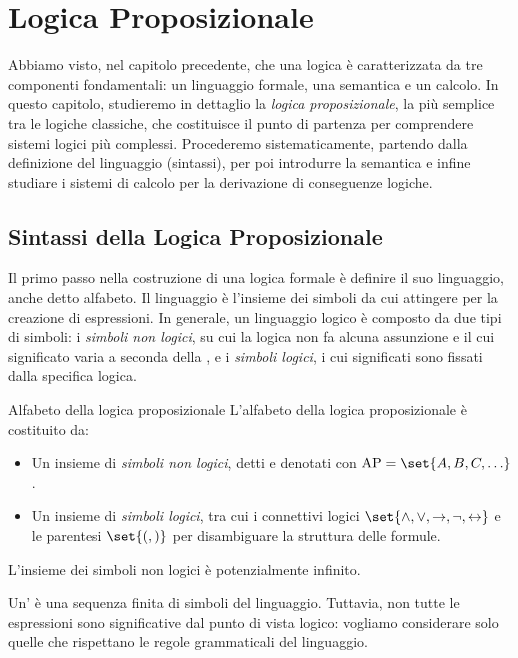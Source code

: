 \chapter{Logica Proposizionale}

Abbiamo visto, nel capitolo precedente, che una logica è caratterizzata da tre componenti fondamentali: un linguaggio formale, una semantica e un calcolo.
In questo capitolo, studieremo in dettaglio la \textit{logica proposizionale}, la più semplice tra le logiche classiche, che costituisce il punto di partenza per comprendere sistemi logici più complessi.
Procederemo sistematicamente, partendo dalla definizione del linguaggio (sintassi), per poi introdurre la semantica e infine studiare i sistemi di calcolo per la derivazione di conseguenze logiche.

\section{Sintassi della Logica Proposizionale}

Il primo passo nella costruzione di una logica formale è definire il suo linguaggio, anche detto alfabeto. Il linguaggio è l'insieme dei simboli da cui attingere per la creazione di espressioni.
In generale, un linguaggio logico è composto da due tipi di simboli: i \textit{simboli non logici}, su cui la logica non fa alcuna assunzione e il cui significato varia a seconda della , e i \textit{simboli logici}, i cui significati sono fissati dalla specifica logica.

\begin{definition}{Alfabeto della logica proposizionale}
  L'alfabeto della logica proposizionale è costituito da:
  \begin{itemize}
    \item Un insieme di \textit{simboli non logici}, detti  e denotati con \(\AP = \set{A,B,C,\ldots}\).
    \item Un insieme di \textit{simboli logici}, tra cui i connettivi logici \(\set{\land, \lor, \rightarrow, \neg,\leftrightarrow}\) e le parentesi \(\set{(,)}\) per disambiguare la struttura delle formule.
  \end{itemize}
\end{definition}

\begin{note}{}
L'insieme dei simboli non logici è potenzialmente infinito.
\end{note}

Un' è una sequenza finita di simboli del linguaggio.
Tuttavia, non tutte le espressioni sono significative dal punto di vista logico: vogliamo considerare solo quelle che rispettano le regole grammaticali del linguaggio.

